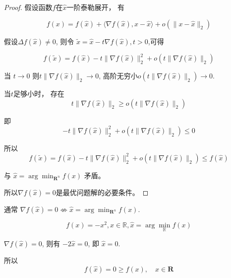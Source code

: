 \begin{proof}
    假设函数$f$在$\hat{x}$一阶泰勒展开， 有

    \begin{equation} f(x)=f(\hat{x})+\langle\nabla f(\hat{x}), x-\hat{x}\rangle+o\left(\|x-\hat{x}\|_{2}\right) \end{equation}

    假设$ \Delta f(\hat{x}) \neq 0 $, 则令 $ \tilde{x}=\hat{x}-t \nabla f(\hat{x}), t>0 $,可得

    \begin{equation} f(\tilde{x})=f(\hat{x})-t\|\nabla f(\hat{x})\|_{2}^{2}+o\left(t\|\nabla f(\hat{x})\|_{2}\right) \end{equation}

    当 $ t \rightarrow 0 $ 则$ t\|\nabla f(\hat{x})\|_{2} \rightarrow 0 $,  高阶无穷小$ {o }\left(t\|\nabla f(\hat{x})\|_{2}\right) \rightarrow 0 $.

    当$t$足够小时， 存在\begin{equation} t\|\nabla f(\hat{x})\|_{2} \geq o\left(t\|\nabla f(\hat{x})\|_{2}\right) \end{equation}
    
    即$$ -t\|\nabla f(\hat{x})\|_{2}^{2}+o\left(t\|\nabla f(\hat{x})\|_{2}\right) \leq 0 $$

    所以
    \begin{equation} f(\tilde{x})=f(\hat{x})-t\|\nabla f(\hat{x})\|_{2}^{2}+o\left(t\|\nabla f(\hat{x})\|_{2}\right) \leq f(\hat{x}) \end{equation}
    
    与 $ \hat{x}=\arg \min _{\mathbf{R}^{n}} f(x) $ 矛盾。 

    所以$ \nabla f(\widehat{x})=0 $是最优问题解的必要条件。 
\end{proof}

\begin{remark}
    通常 $ \nabla f(\hat{x})=0 \not \Leftrightarrow \hat{x}=\arg \min _{\mathbf{R}^{n}} f(x) $. 
\end{remark}

\begin{example}
    \begin{equation} f(x)=-x^{2},  x \in \mathbb{R}, \hat{x}=\arg \min _{\mathbb{R}} f(x) \end{equation}

    $ \nabla f(\hat{x})=0 $, 则有 $ -2 \hat{x}=0 $, 即 $ \hat{x}=0 $.

    所以
    \begin{equation} f(\hat{x})=0 \geq f(x), \quad x \in \mathbf{R} \end{equation}


\end{example}

